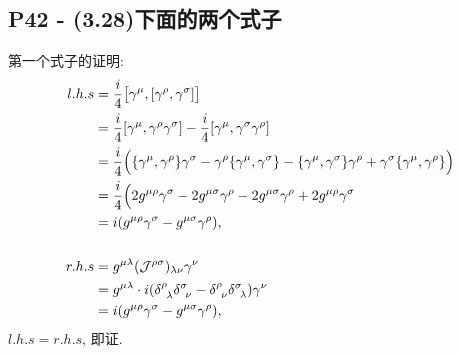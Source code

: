 \subsection{P42 - (3.28)下面的两个式子}

第一个式子的证明:
\begin{equation}
  \begin{aligned}
    l.h.s & = \frac{i}{4}\bigl[\gamma^\mu, [\gamma^\rho, \gamma^\sigma]\bigr]                                                                                                                                  \\
          & = \frac{i}{4}[\gamma^\mu, \gamma^\rho \gamma^\sigma] - \frac{i}{4}[\gamma^\mu, \gamma^\sigma \gamma^\rho]                                                                                          \\
          & = \frac{i}{4}\Bigl(\{\gamma^\mu, \gamma^\rho\}\gamma^\sigma - \gamma^\rho\{\gamma^\mu, \gamma^\sigma\} - \{\gamma^\mu, \gamma^\sigma\}\gamma^\rho + \gamma^\sigma\{\gamma^\mu, \gamma^\rho\}\Bigr) \\
          & = \frac{i}{4}\Bigl(2g^{\mu\rho}\gamma^\sigma - 2g^{\mu\sigma}\gamma^\rho - 2g^{\mu\sigma}\gamma^\rho + 2g^{\mu\rho}\gamma^\sigma                                                                   \\
          & = i(g^{\mu\rho}\gamma^\sigma - g^{\mu\sigma}\gamma^\rho),                                                                                                                                          \\
    \                                                                                                                                                                                                          \\
    r.h.s & = g^{\mu\lambda}(\mathcal{J}^{\rho\sigma})_{\lambda\nu} \gamma^\nu                                                                                                                                 \\
          & = g^{\mu\lambda}\cdot i(\delta^\rho_{\phantom{1}\lambda} \delta^\sigma_{\phantom{1}\nu} - \delta^\rho_{\phantom{1}\nu} \delta^\sigma_{\phantom{1}\lambda}) \gamma^\nu                              \\
          & = i(g^{\mu\rho}\gamma^\sigma - g^{\mu\sigma}\gamma^\rho),
  \end{aligned}
\end{equation}
$l.h.s = r.h.s$, 即证.

